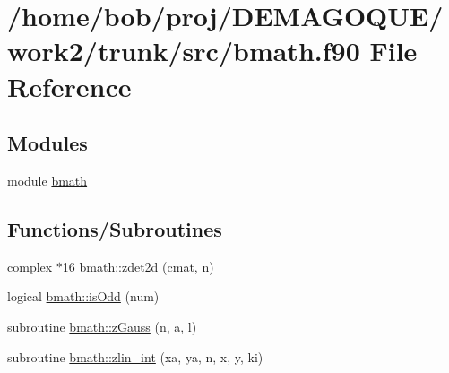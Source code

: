 \hypertarget{bmath_8f90}{
\section{/home/bob/proj/DEMAGOQUE/work2/trunk/src/bmath.f90 File Reference}
\label{bmath_8f90}
}
\subsection*{Modules}
\begin{DoxyCompactItemize}
\item 
module \hyperlink{namespacebmath}{bmath}
\end{DoxyCompactItemize}
\subsection*{Functions/Subroutines}
\begin{DoxyCompactItemize}
\item 
complex $\ast$16 \hyperlink{namespacebmath_a94ae3022a9719013e6bf0d5e5230c81c}{bmath::zdet2d} (cmat, n)
\item 
logical \hyperlink{namespacebmath_ae3461b33a83e4fe3bd49f01b9345c3c5}{bmath::isOdd} (num)
\item 
subroutine \hyperlink{namespacebmath_ac569fe0169cdaadfacf9236f3d1b4410}{bmath::zGauss} (n, a, l)
\item 
subroutine \hyperlink{namespacebmath_a75f76714b32b64ea7e2f8d78fac52f52}{bmath::zlin\_\-int} (xa, ya, n, x, y, ki)
\end{DoxyCompactItemize}
